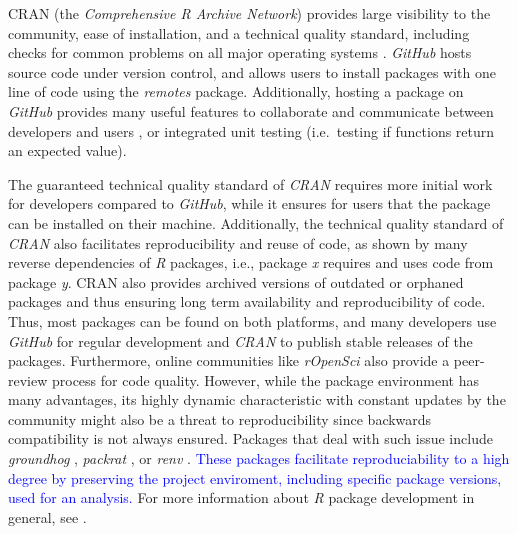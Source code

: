 \documentclass[smallextended]{svjour3}       %
\begin{document}
CRAN (the \textit{Comprehensive R Archive Network}) provides large visibility to the community, ease of installation, and a technical quality standard, including checks for common problems on all major operating systems \cite{Wickham2015}.
\textit{GitHub} hosts source code under version control, and allows users to install packages with one line of code using the \textit{remotes} \cite{Hester2020} package.
Additionally, hosting a package on \textit{GitHub} provides many useful features to collaborate and communicate between developers and users \cite{Wickham2015}, or integrated unit testing (i.e.~testing if functions return an expected value).

The guaranteed technical quality standard of \textit{CRAN} requires more initial work for developers compared to \textit{GitHub}, while it ensures for users that the package can be installed on their machine.
Additionally, the technical quality standard of \textit{CRAN} also facilitates reproducibility and reuse of code, as shown by many reverse dependencies of \textit{R} packages, i.e., package \textit{x} requires and uses code from package \textit{y}.
CRAN also provides archived versions of outdated or orphaned packages and thus ensuring long term availability and reproducibility of code.
Thus, most packages can be found on both platforms, and many developers use \textit{GitHub} for regular development and \textit{CRAN} to publish stable releases of the packages.
Furthermore, online communities like \textit{rOpenSci} also provide a peer-review process for code quality.
However, while the package environment has many advantages, its highly dynamic characteristic with constant updates by the community might also be a threat to reproducibility since backwards compatibility is not always ensured.
Packages that deal with such issue include \textit{groundhog} \cite{Simonsohn2021}, \textit{packrat} \cite{Ushey2018}, or \textit{renv} \cite{Ushey2020}.
\textcolor{blue}{These packages facilitate reproduciability to a high degree by preserving the project enviroment, including specific package versions, used for an analysis.}
For more information about \textit{R} package development in general, see \cite{Wickham2015}.
\end{document}
